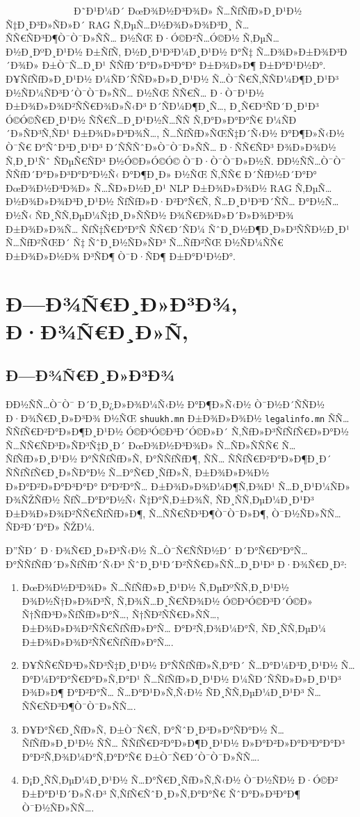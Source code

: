 \documentclass[12pt,A4]{report}
\begin{document}
\
\ \ \ \ \ \ \ \ \  \ \ \ \ Ð˜Ð¹Ð¼Ð´ ÐœÐ¾Ð½Ð³Ð¾Ð» Ñ…ÑƒÑƒÐ»Ð¸Ð¹Ð½ Ñ‡Ð¸Ð³Ð»ÑÐ»Ð´ RAG Ñ‚ÐµÑ…Ð½Ð¾Ð»Ð¾Ð³Ð¸
Ñ…ÑÑ€ÑÐ³Ð¶Ò¯Ò¯Ð»ÑÑ… Ð½ÑŒ Ð·Ó©Ð²Ñ…Ó©Ð½ Ñ‚ÐµÑ…Ð½Ð¸ÐºÐ¸Ð¹Ð½ Ð±ÑƒÑ, Ð½Ð¸Ð¹Ð³Ð¼Ð¸Ð¹Ð½ Ð°Ñ‡ Ñ…Ð¾Ð»Ð±Ð¾Ð³Ð´Ð¾Ð» Ð±Ò¯Ñ…Ð¸Ð¹
ÑÑƒÐ´Ð°Ð»Ð³Ð°Ð° Ð±Ð¾Ð»Ð¶ Ð±Ð°Ð¹Ð½Ð°. Ð¥ÑƒÑƒÐ»Ð¸Ð¹Ð½ Ð¼ÑÐ´ÑÑÐ»Ð»Ð¸Ð¹Ð½ Ñ…Ò¯Ñ€Ñ‚ÑÑÐ¼Ð¶Ð¸Ð¹Ð³ Ð½ÑÐ¼ÑÐ³Ð´Ò¯Ò¯Ð»ÑÑ… Ð½ÑŒ
ÑÑ€Ñ… Ð·Ò¯Ð¹Ð½ Ð±Ð¾Ð»Ð¾Ð²ÑÑ€Ð¾Ð»Ñ‹Ð³ Ð´ÑÐ¼Ð¶Ð¸Ñ…, Ð¸Ñ€Ð³ÑÐ´Ð¸Ð¹Ð³ Ó©Ó©Ñ€Ð¸Ð¹Ð½ ÑÑ€Ñ…Ð¸Ð¹Ð½Ñ…ÑÑ Ñ‚Ð°Ð»Ð°Ð°Ñ€
Ð¼ÑÐ´Ð»ÑÐ³Ñ‚ÑÐ¹ Ð±Ð¾Ð»Ð³Ð¾Ñ…, Ñ…ÑƒÑƒÐ»ÑŒÑ‡Ð´Ñ‹Ð½ Ð°Ð¶Ð»Ñ‹Ð½ Ò¯Ñ€ Ð°ÑˆÐ³Ð¸Ð¹Ð³ Ð´ÑÑÑˆÐ»Ò¯Ò¯Ð»ÑÑ… Ð·ÑÑ€ÑÐ³ Ð¾Ð»Ð¾Ð½
Ñ‚Ð¸Ð¹Ñˆ ÑÐµÑ€ÑÐ³ Ð½Ó©Ð»Ó©Ó© Ò¯Ð·Ò¯Ò¯Ð»Ð½Ñ. Ð­Ð½ÑÑ…Ò¯Ò¯ ÑÑƒÐ´Ð°Ð»Ð³Ð°Ð°Ð½Ñ‹ Ð°Ð¶Ð¸Ð» Ð½ÑŒ Ñ‚ÑÑ€ Ð´ÑƒÐ½Ð´Ð°Ð°
ÐœÐ¾Ð½Ð³Ð¾Ð» Ñ…ÑÐ»Ð½Ð¸Ð¹ NLP Ð±Ð¾Ð»Ð¾Ð½ RAG Ñ‚ÐµÑ…Ð½Ð¾Ð»Ð¾Ð³Ð¸Ð¹Ð½ ÑƒÑƒÐ»Ð·Ð²Ð°Ñ€Ñ‚ Ñ…Ð¸Ð¹Ð³Ð´ÑÑ… Ð°Ð½Ñ…Ð½Ñ‹
ÑÐ¸ÑÑ‚ÐµÐ¼Ñ‡Ð¸Ð»ÑÑÐ½ Ð¾Ñ€Ð¾Ð»Ð´Ð»Ð¾Ð³Ð¾ Ð±Ð¾Ð»Ð¾Ñ… ÑƒÑ‡Ñ€Ð°Ð°Ñ ÑÑ€Ð´ÑÐ¼ ÑˆÐ¸Ð½Ð¶Ð¸Ð»Ð³ÑÑÐ½Ð¸Ð¹ Ñ…ÑƒÐ²ÑŒÐ´ Ñ‡
ÑˆÐ¸Ð½ÑÐ»ÑÐ³ Ñ…ÑƒÐ²ÑŒ Ð½ÑÐ¼ÑÑ€ Ð±Ð¾Ð»Ð½Ð¾ Ð³ÑÐ¶ Ò¯Ð·ÑÐ¶ Ð±Ð°Ð¹Ð½Ð°.

\chapter{Ð—Ð¾Ñ€Ð¸Ð»Ð³Ð¾, Ð·Ð¾Ñ€Ð¸Ð»Ñ‚}
\section{Ð—Ð¾Ñ€Ð¸Ð»Ð³Ð¾}

Ð­Ð½ÑÑ…Ò¯Ò¯ Ð´Ð¸Ð¿Ð»Ð¾Ð¼Ñ‹Ð½ Ð°Ð¶Ð»Ñ‹Ð½ Ò¯Ð½Ð´ÑÑÐ½ Ð·Ð¾Ñ€Ð¸Ð»Ð³Ð¾ Ð½ÑŒ \texttt{shuukh.mn} Ð±Ð¾Ð»Ð¾Ð½ 
\texttt{legalinfo.mn} ÑÑ… ÑÑƒÑ€Ð²Ð°Ð»Ð¶Ð¸Ð¹Ð½ Ó©Ð³Ó©Ð³Ð´Ó©Ð»Ð´ Ñ‚ÑƒÐ»Ð³ÑƒÑƒÑ€Ð»Ð°Ð½ Ñ…ÑÑ€ÑÐ³Ð»ÑÐ³Ñ‡Ð¸Ð´ 
ÐœÐ¾Ð½Ð³Ð¾Ð» Ñ…ÑÐ»ÑÑÑ€ Ñ…ÑƒÑƒÐ»Ð¸Ð¹Ð½ Ð°ÑÑƒÑƒÐ»Ñ‚ Ð°ÑÑƒÑƒÐ¶, ÑÑ… ÑÑƒÑ€Ð²Ð°Ð»Ð¶Ð¸Ð´ ÑÑƒÑƒÑ€Ð¸Ð»ÑÐ°Ð½ Ñ…Ð°Ñ€Ð¸ÑƒÐ»Ñ‚ Ð±Ð¾Ð»Ð¾Ð½ 
Ð»Ð°Ð²Ð»Ð°Ð³Ð°Ð° Ð°Ð²Ð°Ñ… Ð±Ð¾Ð»Ð¾Ð¼Ð¶Ñ‚Ð¾Ð¹ Ñ…Ð¸Ð¹Ð¼ÑÐ» Ð¾ÑŽÑƒÐ½ ÑƒÑ…Ð°Ð°Ð½Ñ‹ Ñ‡Ð°Ñ‚Ð±Ð¾Ñ‚ ÑÐ¸ÑÑ‚ÐµÐ¼Ð¸Ð¹Ð³ Ð±Ð¾Ð»Ð¾Ð²ÑÑ€ÑƒÑƒÐ»Ð¶, 
Ñ…ÑÑ€ÑÐ³Ð¶Ò¯Ò¯Ð»Ð¶, Ò¯Ð½ÑÐ»ÑÑ… ÑÐ²Ð´Ð°Ð» ÑŽÐ¼.

Ð”ÑÐ´ Ð·Ð¾Ñ€Ð¸Ð»Ð³Ñ‹Ð½ Ñ…Ò¯Ñ€ÑÑÐ½Ð´ Ð´Ð°Ñ€Ð°Ð°Ñ… Ð°ÑÑƒÑƒÐ´Ð»ÑƒÑƒÐ´Ñ‹Ð³ ÑˆÐ¸Ð¹Ð´Ð²ÑÑ€Ð»ÑÑ…Ð¸Ð¹Ð³ Ð·Ð¾Ñ€Ð¸Ð²:

\begin{enumerate}
    \item ÐœÐ¾Ð½Ð³Ð¾Ð» Ñ…ÑƒÑƒÐ»Ð¸Ð¹Ð½ Ñ‚ÐµÐºÑÑ‚Ð¸Ð¹Ð½ Ð¾Ð½Ñ†Ð»Ð¾Ð³Ñ‚ Ñ‚Ð¾Ñ…Ð¸Ñ€ÑÐ¾Ð½ Ó©Ð³Ó©Ð³Ð´Ó©Ð» Ñ†ÑƒÐ³Ð»ÑƒÑƒÐ»Ð°Ñ…, 
    Ñ†ÑÐ²ÑÑ€Ð»ÑÑ…, Ð±Ð¾Ð»Ð¾Ð²ÑÑ€ÑƒÑƒÐ»Ð°Ñ… Ð°Ð²Ñ‚Ð¾Ð¼Ð°Ñ‚ ÑÐ¸ÑÑ‚ÐµÐ¼ Ð±Ð¾Ð»Ð¾Ð²ÑÑ€ÑƒÑƒÐ»Ð°Ñ….
    
    \item Ð¥ÑÑ€ÑÐ³Ð»ÑÐ³Ñ‡Ð¸Ð¹Ð½ Ð°ÑÑƒÑƒÐ»Ñ‚Ð°Ð´ Ñ…Ð°Ð¼Ð³Ð¸Ð¹Ð½ Ñ…Ð°Ð¼Ð°Ð°Ñ€Ð°Ð»Ñ‚Ð°Ð¹ Ñ…ÑƒÑƒÐ»Ð¸Ð¹Ð½ Ð¼ÑÐ´ÑÑÐ»Ð»Ð¸Ð¹Ð³ 
    Ð¾Ð»Ð¶ Ð°Ð²Ð°Ñ… Ñ…Ð°Ð¹Ð»Ñ‚Ñ‹Ð½ ÑÐ¸ÑÑ‚ÐµÐ¼Ð¸Ð¹Ð³ Ñ…ÑÑ€ÑÐ³Ð¶Ò¯Ò¯Ð»ÑÑ….
    
    \item Ð¥Ð°Ñ€Ð¸ÑƒÐ»Ñ‚ Ð±Ò¯Ñ€Ñ‚ Ð°ÑˆÐ¸Ð³Ð»Ð°ÑÐ°Ð½ Ñ…ÑƒÑƒÐ»Ð¸Ð¹Ð½ ÑÑ… ÑÑƒÑ€Ð²Ð°Ð»Ð¶Ð¸Ð¹Ð½ Ð»Ð°Ð²Ð»Ð°Ð³Ð°Ð°Ð³ 
    Ð°Ð²Ñ‚Ð¾Ð¼Ð°Ñ‚Ð°Ð°Ñ€ Ð±Ò¯Ñ€Ð´Ò¯Ò¯Ð»ÑÑ….
    
    \item Ð¡Ð¸ÑÑ‚ÐµÐ¼Ð¸Ð¹Ð½ Ñ…Ð°Ñ€Ð¸ÑƒÐ»Ñ‚Ñ‹Ð½ Ò¯Ð½ÑÐ½ Ð·Ó©Ð² Ð±Ð°Ð¹Ð´Ð»Ñ‹Ð³ Ñ‚ÑƒÑ€ÑˆÐ¸Ð»Ñ‚Ð°Ð°Ñ€ ÑˆÐ°Ð»Ð³Ð°Ð¶ Ò¯Ð½ÑÐ»ÑÑ….
\end{enumerate}
\end{document}

